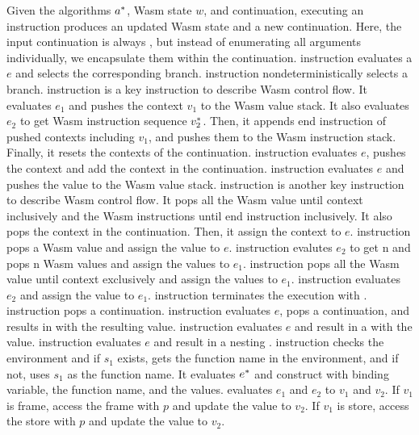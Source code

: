Given the algorithms $a^*$, Wasm state $w$, and continuation, executing an
instruction produces an updated Wasm state and a new continuation.
Here, the input continuation is always \algo{}, but instead of enumerating all
arguments individually, we encapsulate them within the \algo{} continuation.
\ifi{} instruction evaluates a $e$ and selects the corresponding branch.
\eitheri{} instruction nondeterministically selects a branch.
\enteri{} instruction is a key instruction to describe Wasm control flow.
It evaluates $e_1$ and pushes the context $v_1$ to the Wasm value stack.
It also evaluates $e_2$ to get Wasm instruction sequence $v_2^*$.
Then, it appends end instruction of pushed contexts including $v_1$, and pushes
them to the Wasm instruction stack.
Finally, it resets the contexts of the continuation.
\pushctxi{} instruction evaluates $e$, pushes the context and add the context
in the continuation.
\pushi{} instruction evaluates $e$ and pushes the value to the Wasm value
stack.
\popctxi{} instruction is another key instruction to describe Wasm control
flow.
It pops all the Wasm value until context inclusively and the Wasm instructions
until end instruction inclusively.
It also pops the context in the continuation.
Then, it assign the context to $e$.
\popi{} instruction pops a Wasm value and assign the value to $e$.
\popn{} instruction evalutes $e_2$ to get n and pops n Wasm values and assign
the values to $e_1$.
\popalli{} instruction pops all the Wasm value until context exclusively and
assign the values to $e_1$.
 instruction evaluates $e_2$ and assign the value to $e_1$.
\trapi{} instruction terminates the execution with \trapv{}.
\returnreli{} instruction pops a continuation.
\returnfunci{} instruction evaluates $e$, pops a continuation, and results in
\ret{} with the resulting value.
\executei{} instruction evaluates $e$ and result in a \exe{} with the value.
\executeseqi{} instruction evaluates $e$ and result in a nesting \exe{}.
\calli{} instruction checks the environment and if $s_1$ exists, gets the
function name in the environment, and if not, uses $s_1$ as the function name.
It evaluates $e^*$ and construct \call{} with binding variable, the function
name, and the values.
\replacei{} evaluates $e_1$ and $e_2$ to $v_1$ and $v_2$.
If $v_1$ is frame, access the frame with $p$ and update the value to $v_2$.
If $v_1$ is store, access the store with $p$ and update the value to $v_2$.




